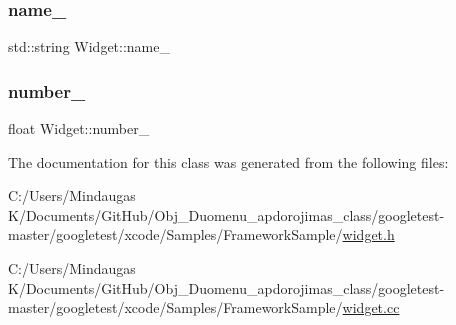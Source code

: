 \subsubsection{\texorpdfstring{name\_}{name\_}}
{\footnotesize\ttfamily std\+::string Widget\+::name\+\_\+\hspace{0.3cm}{\ttfamily [private]}}

\mbox{\label{class_widget_a27a2b3fd66372d5731fa9a6bcaab755b}} 
\subsubsection{\texorpdfstring{number\_}{number\_}}
{\footnotesize\ttfamily float Widget\+::number\+\_\+\hspace{0.3cm}{\ttfamily [private]}}



The documentation for this class was generated from the following files\+:\begin{DoxyCompactItemize}
\item 
C\+:/\+Users/\+Mindaugas K/\+Documents/\+Git\+Hub/\+Obj\+\_\+\+Duomenu\+\_\+apdorojimas\+\_\+class/googletest-\/master/googletest/xcode/\+Samples/\+Framework\+Sample/\mbox{\hyperlink{googletest-master_2googletest_2xcode_2_samples_2_framework_sample_2widget_8h}{widget.\+h}}\item 
C\+:/\+Users/\+Mindaugas K/\+Documents/\+Git\+Hub/\+Obj\+\_\+\+Duomenu\+\_\+apdorojimas\+\_\+class/googletest-\/master/googletest/xcode/\+Samples/\+Framework\+Sample/\mbox{\hyperlink{googletest-master_2googletest_2xcode_2_samples_2_framework_sample_2widget_8cc}{widget.\+cc}}\end{DoxyCompactItemize}
